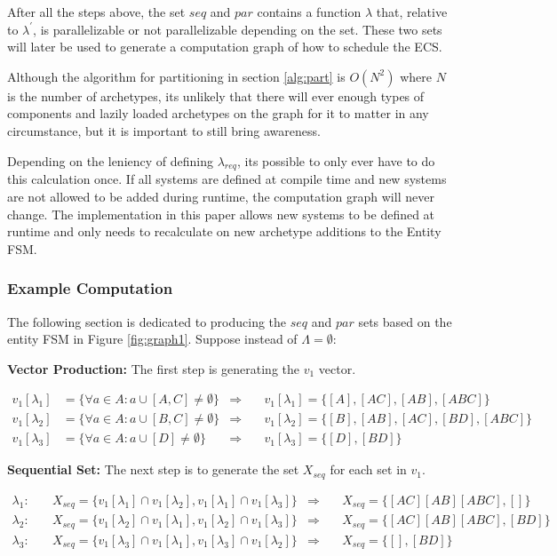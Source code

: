 After all the steps above, the set $seq$ and $par$ contains a function $\lambda$ that, relative to $\lambda^\prime$, is parallelizable or not parallelizable depending on the set. These two sets will later be used to generate a computation graph of how to schedule the ECS.

Although the algorithm for partitioning in section \ref{alg:part} is $O(N^2)$ where $N$ is the number of archetypes, its unlikely that there will ever enough types of components and lazily loaded archetypes on the graph for it to matter in any circumstance, but it is important to still bring awareness.

Depending on the leniency of defining $\lambda_{req}$, its possible to only ever have to do this calculation once. If all systems are defined at compile time and new systems are not allowed to be added during runtime, the computation graph will never change. The implementation in this paper allows new systems to be defined at runtime and only needs to recalculate on new archetype additions to the Entity FSM.

\subsubsection{Example Computation}
The following section is dedicated to producing the $seq$ and $par$ sets based on the entity FSM in Figure \ref{fig:graph1}. Suppose instead of $\Lambda = \emptyset$:


\textbf{Vector Production:} The first step is generating the $v_1$ vector.

\begin{align*}
    v_1[\lambda_1] &= \{ \forall a \in A : a \cup [A,C] \neq \emptyset \} & \Rightarrow &
    \quad v_1[\lambda_1] = \{[A],[AC],[AB],[ABC]\} \\
    v_1[\lambda_2] &= \{ \forall a \in A : a \cup [B,C] \neq \emptyset \} & \Rightarrow &
    \quad v_1[\lambda_2] = \{[B],[AB],[AC],[BD],[ABC]\} \\
    v_1[\lambda_3] &= \{ \forall a \in A : a \cup [D] \neq \emptyset \} & \Rightarrow &
    \quad v_1[\lambda_3] = \{[D],[BD]\}
\end{align*}

\textbf{Sequential Set:} The next step is to generate the set $X_{seq}$ for each set in $v_1$.

\begin{align*}
    \lambda_1: \quad & X_{seq} = \{v_1[\lambda_1] \cap v_1[\lambda_2], v_1[\lambda_1] \cap v_1[\lambda_3]\} & \Rightarrow & \quad X_{seq} = \{[AC][AB][ABC],[]\} \\ 
    \lambda_2: \quad & X_{seq} = \{v_1[\lambda_2] \cap v_1[\lambda_1], v_1[\lambda_2] \cap v_1[\lambda_3]\} & \Rightarrow & \quad X_{seq} = \{[AC][AB][ABC],[BD]\} \\ 
    \lambda_3: \quad & X_{seq} = \{v_1[\lambda_3] \cap v_1[\lambda_1], v_1[\lambda_3] \cap v_1[\lambda_2]\} & \Rightarrow & \quad X_{seq} = \{[],[BD]\} \\ 
\end{align*}

